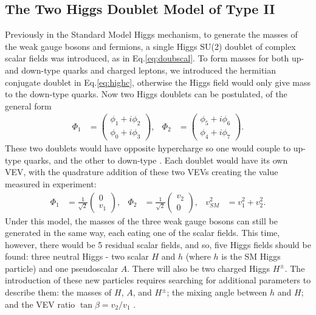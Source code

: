 \documentclass[a4paper,12pt]{article}
\begin{document}
\subsection{The Two Higgs Doublet Model of Type II}
\label{subsec:2hdm}
Previously in the Standard Model Higgs mechanism, to generate the masses of the weak gauge bosons and fermions, a single Higgs SU(2) doublet of complex scalar fields was introduced, as in Eq.\eqref{eq:doubscal}.
To form masses for both up- and down-type quarks and charged leptons, we introduced the hermitian conjugate doublet in Eq.\eqref{eq:highc}, otherwise the Higgs field would only give mass to the down-type quarks. 
Now two Higgs doublets can be postulated, of the general form
\begin{align}
    \label{eq:gdbl}
    \Phi_1 &= \begin{pmatrix} \phi_1 + i\phi_2 \\ \phi_0 + i\phi_3\end{pmatrix}, & \Phi_2 &= \begin{pmatrix} \phi_5+i\phi_6\\\phi_4+i\phi_7\end{pmatrix}.
\end{align}
These two doublets would have opposite hypercharge so one would couple to up-type quarks, and the other to down-type \cite{branco}. 
Each doublet would have its own VEV, with the quadrature addition of these two VEVs creating the value measured in experiment:
\begin{align}
    \label{eq:dbldbl}
    \Phi_1 &= \frac{1}{\sqrt{2}}\begin{pmatrix}0\\v_1\end{pmatrix}, & \Phi_2 &= \frac{1}{\sqrt{2}}\begin{pmatrix}v_2\\0\end{pmatrix}, & v_{SM}^2 &= v_1^2 + v_2^2.
\end{align}
Under this model, the masses of the three weak gauge bosons can still be generated in the same way, each eating one of the scalar fields. 
This time, however, there would be 5 residual scalar fields, and so, five Higgs fields should be found: three neutral Higgs - two scalar $H$ and $h$ (where $h$ is the SM Higgs particle) and one pseudoscalar $A$.
There will also be two charged Higgs $H^\pm$.
The introduction of these new particles requires searching for additional parameters to describe them: the masses of $H$, $A$, and $H^\pm$; the mixing angle between $h$ and $H$; and the VEV ratio $\tan\beta=v_2/v_1$ \cite{desc}.
\end{document}

